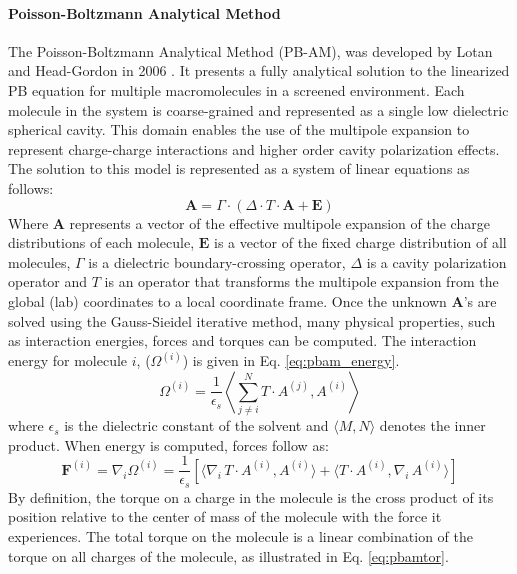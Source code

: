 \documentclass[journal=jpcbfk, manuscript=article]{achemso}
\begin{document}
\paragraph{Poisson-Boltzmann Analytical Method}
The Poisson-Boltzmann Analytical Method (PB-AM), was developed by Lotan and Head-Gordon in 2006 \cite{lotan2006}. It presents a fully analytical solution to the linearized PB equation for multiple macromolecules in a screened environment. Each molecule in the system is coarse-grained and represented as a single low dielectric spherical cavity. This domain enables the use of the multipole expansion to represent charge-charge interactions and higher order cavity polarization effects. The solution to this model is represented as a system of linear equations as follows:
%
\begin{equation}\label{eq:pbam_solve}
	\mathbf{A} = \Gamma \cdot (\Delta \cdot T \cdot \mathbf{A} + \mathbf{E})
\end{equation}
%
Where \(\mathbf{A}\) represents a vector of the effective multipole expansion of the charge distributions of each molecule, \(\mathbf{E}\) is a vector of the fixed charge distribution of all molecules, \(\Gamma\) is a dielectric boundary-crossing operator, \(\Delta\) is a cavity polarization operator and \(T\) is an operator that transforms the multipole expansion from the global (lab) coordinates to a local coordinate frame. Once the unknown \textbf{A}'s are solved using the Gauss-Sieidel iterative method, many physical properties, such as interaction energies, forces and torques can be computed. The interaction energy for molecule \(i\), ($\Omega^{(i)}$) is given in Eq. \ref{eq:pbam_energy}.
%
\begin{equation}\label{eq:pbam_energy}
	\Omega^{(i)}=\frac{1}{\epsilon_s} \left \langle \sum_{j \ne i}^N  T \cdot A^{(j) } ,  A^{(i) } \right \rangle 
\end{equation}
%
where $\epsilon_s$ is the dielectric constant of the solvent and $\langle  M, N \rangle$ denotes the inner product. When energy is computed, forces follow as:
%
\begin{equation}\label{eq:pbam_force}
	\textbf{F}^{(i)} = \nabla_i \Omega^{(i)}=\frac{1}{\epsilon_s} [ \langle \nabla_i \,T \cdot A^{(i) } ,  A^{(i) } \rangle +  \langle T \cdot A^{(i) } ,   \nabla_i \, A^{(i) } \rangle ]
\end{equation}
%
By definition, the torque on a charge in the molecule is the cross product of its position relative to the center of mass of the molecule with the force it experiences. The total torque on the molecule is a linear combination of the torque on all charges of the molecule, as illustrated in Eq. \ref{eq:pbamtor}.
\end{document}
